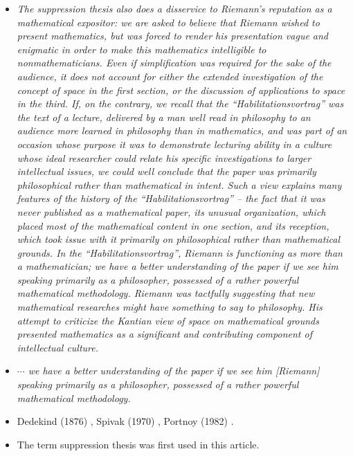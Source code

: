 \documentclass[12pt]{article}
\begin{document}
\begin{itemize}
\begin{itemize}
\item[]{\it The suppression thesis also does a disservice to Riemann's reputation as a mathematical expositor: we are asked to believe that Riemann wished to present mathematics, but was forced to render his presentation vague and enigmatic in order to make this mathematics intelligible to nonmathematicians. Even if simplification was required for the sake of the audience, it does not account for either the extended investigation of the concept of space in the first section, or the discussion of applications to space in the third. If, on the contrary, we recall that the ``Habilitationsvortrag'' was the text of a lecture, delivered by a man well read in philosophy to an audience more learned in philosophy than in mathematics, and was part of an occasion whose purpose it was to demonstrate lecturing ability in a culture whose ideal researcher could relate his specific investigations to larger intellectual issues, we could well conclude that the paper was primarily philosophical rather than mathematical in intent. Such a view explains many features of the history of the ``Habilitationsvortrag'' -- the fact that it was never published as a mathematical paper, its unusual organization, which placed most of the mathematical content in one section, and its reception, which took issue with it primarily on philosophical rather than mathematical grounds. In the ``Habilitationsvortrag'', Riemann is functioning as more than a mathematician; we have a better understanding of the paper if we see him speaking primarily as a philosopher, possessed of a rather powerful mathematical methodology. Riemann was tactfully suggesting that new mathematical researches might have something to say to philosophy. His attempt to criticize the Kantian view of space on mathematical grounds presented mathematics as a significant and contributing component of intellectual culture.}

\item[]{\it $\cdots$ we have a better understanding of the paper if we see him [Riemann] speaking primarily as a philosopher, possessed of a rather powerful mathematical methodology.}

\item[$\bullet$]Dedekind (1876) \cite{Dedekind1876b}, Spivak (1970) \cite{Spivak1970}, Portnoy (1982) \cite{Portnoy1982}.

\item[]The term suppression thesis was first used in this article.

\end{itemize}


\end{itemize}
\end{document}

